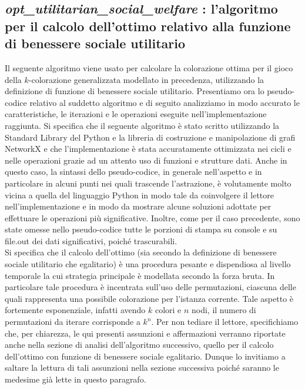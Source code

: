 \subsection{\textit{opt\_utilitarian\_social\_welfare} : l'algoritmo per il calcolo dell'ottimo relativo alla funzione di benessere sociale utilitario}
\justify
Il seguente algoritmo viene usato per calcolare la colorazione ottima per il gioco della \(k\)-colorazione generalizzata modellato in precedenza, utilizzando la definizione di funzione di benessere sociale utilitario. Presentiamo ora lo pseudo-codice relativo al suddetto algoritmo e di seguito analizziamo in modo accurato le caratteristiche, le iterazioni e le operazioni eseguite nell'implementazione raggiunta. Si specifica che il seguente algoritmo è stato scritto utilizzando la Standard Library del Python e la libreria di costruzione e manipolazione di grafi NetworkX e che l'implementazione è stata accuratamente ottimizzata nei cicli e nelle operazioni grazie ad un attento uso di funzioni e strutture dati. Anche in questo caso, la sintassi dello pseudo-codice, in generale nell'aspetto e in particolare in alcuni punti nei quali trascende l'astrazione, è volutamente molto vicina a quella del linguaggio Python in modo tale da coinvolgere il lettore nell'implementazione e in modo da mostrare alcune soluzioni adottate per effettuare le operazioni più significative. Inoltre, come per il caso precedente, sono state omesse nello pseudo-codice tutte le porzioni di stampa su console e su file.out dei dati significativi, poiché trascurabili.\\
Si specifica che il calcolo dell'ottimo (sia secondo la definizione di benessere sociale utilitario che egalitario) è una procedura pesante e dispendiosa al livello temporale la cui strategia principale è modellata secondo la forza bruta. In particolare tale procedura è incentrata sull'uso delle permutazioni, ciascuna delle quali rappresenta una possibile colorazione per l'istanza corrente. Tale aspetto è fortemente esponenziale, infatti avendo \(k\) colori e \(n\) nodi, il numero di permutazioni da iterare corrisponde a \(k^n\). Per non tediare il lettore, specifichiamo che, per chiarezza, le qui presenti assunzioni e affermazioni verranno riportate anche nella sezione di analisi dell'algoritmo successivo, quello per il calcolo dell'ottimo con funzione di benessere sociale egalitario. Dunque lo invitiamo a saltare la lettura di tali assunzioni nella sezione successiva poiché saranno le medesime già lette in questo paragrafo.

